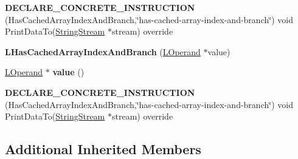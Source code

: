 \begin{DoxyCompactItemize}
\item 
{\bfseries D\+E\+C\+L\+A\+R\+E\+\_\+\+C\+O\+N\+C\+R\+E\+T\+E\+\_\+\+I\+N\+S\+T\+R\+U\+C\+T\+I\+ON} (Has\+Cached\+Array\+Index\+And\+Branch,\char`\"{}has-\/cached-\/array-\/index-\/and-\/branch\char`\"{}) void Print\+Data\+To(\hyperlink{classv8_1_1internal_1_1_string_stream}{String\+Stream} $\ast$stream) override\hypertarget{classv8_1_1internal_1_1_l_has_cached_array_index_and_branch_ada0480ef52e3ce280f071aa7c11faa18}{}\label{classv8_1_1internal_1_1_l_has_cached_array_index_and_branch_ada0480ef52e3ce280f071aa7c11faa18}

\item 
{\bfseries L\+Has\+Cached\+Array\+Index\+And\+Branch} (\hyperlink{classv8_1_1internal_1_1_l_operand}{L\+Operand} $\ast$value)\hypertarget{classv8_1_1internal_1_1_l_has_cached_array_index_and_branch_a466ac157abb71acfb478af7ce2d78d3e}{}\label{classv8_1_1internal_1_1_l_has_cached_array_index_and_branch_a466ac157abb71acfb478af7ce2d78d3e}

\item 
\hyperlink{classv8_1_1internal_1_1_l_operand}{L\+Operand} $\ast$ {\bfseries value} ()\hypertarget{classv8_1_1internal_1_1_l_has_cached_array_index_and_branch_ac41a448a9c06b6b037880bdea9490ae4}{}\label{classv8_1_1internal_1_1_l_has_cached_array_index_and_branch_ac41a448a9c06b6b037880bdea9490ae4}

\item 
{\bfseries D\+E\+C\+L\+A\+R\+E\+\_\+\+C\+O\+N\+C\+R\+E\+T\+E\+\_\+\+I\+N\+S\+T\+R\+U\+C\+T\+I\+ON} (Has\+Cached\+Array\+Index\+And\+Branch,\char`\"{}has-\/cached-\/array-\/index-\/and-\/branch\char`\"{}) void Print\+Data\+To(\hyperlink{classv8_1_1internal_1_1_string_stream}{String\+Stream} $\ast$stream) override\hypertarget{classv8_1_1internal_1_1_l_has_cached_array_index_and_branch_ada0480ef52e3ce280f071aa7c11faa18}{}\label{classv8_1_1internal_1_1_l_has_cached_array_index_and_branch_ada0480ef52e3ce280f071aa7c11faa18}

\end{DoxyCompactItemize}
\subsection*{Additional Inherited Members}


